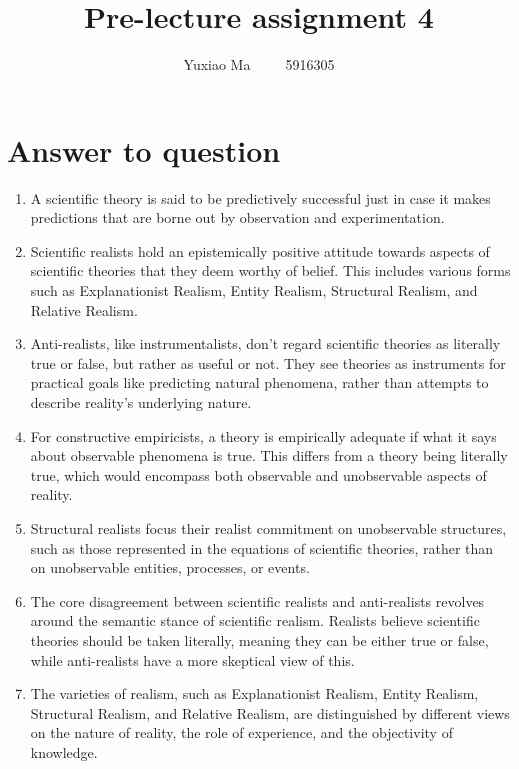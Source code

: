 \documentclass[UTF8,a4paper,AutoFakeBold,AutoFakeSlant]{article}
\title{\textbf{\textsf{{\textsf{Pre-lecture assignment 4}}}}}
\author{\tnewroman Yuxiao Ma~~~~~5916305}
\date{}
\begin{document}
\maketitle


\section{Answer to question}

\begin{enumerate}
    \item A scientific theory is said to be predictively successful just in case it makes predictions that are borne out by observation and experimentation.
    \item Scientific realists hold an epistemically positive attitude towards aspects of scientific theories that they deem worthy of belief. This includes various forms such as Explanationist Realism, Entity Realism, Structural Realism, and Relative Realism.
    \item Anti-realists, like instrumentalists, don't regard scientific theories as literally true or false, but rather as useful or not. They see theories as instruments for practical goals like predicting natural phenomena, rather than attempts to describe reality's underlying nature.
    \item For constructive empiricists, a theory is empirically adequate if what it says about observable phenomena is true. This differs from a theory being literally true, which would encompass both observable and unobservable aspects of reality.
    \item Structural realists focus their realist commitment on unobservable structures, such as those represented in the equations of scientific theories, rather than on unobservable entities, processes, or events.
    \item The core disagreement between scientific realists and anti-realists revolves around the semantic stance of scientific realism. Realists believe scientific theories should be taken literally, meaning they can be either true or false, while anti-realists have a more skeptical view of this.
    \item The varieties of realism, such as Explanationist Realism, Entity Realism, Structural Realism, and Relative Realism, are distinguished by different views on the nature of reality, the role of experience, and the objectivity of knowledge. 
\end{enumerate}
\end{document}
